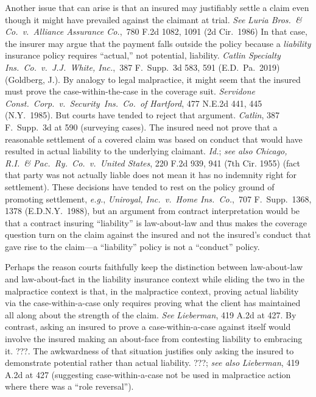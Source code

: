 \documentclass[
  12pt,
  letterpaper,
]{scrartcl}
\begin{document}
Another issue that can arise is that an insured may justifiably settle a claim
even though it might have prevailed against the claimant at trial. \textit{See}
\textit{Luria Bros.~\& Co.~v.~Alliance Assurance Co.},~780 F.2d 1082, 1091 (2d
Cir.~1986) In that case, the insurer may argue that the payment falls outside
the policy because a \emph{liability} insurance policy requires ``actual,'' not
potential, liability. \textit{Catlin Specialty Ins.~Co.~v.~J.J.~White,
Inc.},~387 F.~Supp.~3d 583, 591 (E.D.~Pa.~2019) (Goldberg, J.). By analogy to
legal malpractice, it might seem that the insured must prove the
case-within-the-case in the coverage suit. \textit{Servidone
Const.~Corp.~v.~Security~Ins.~Co.~of Hartford}, 477 N.E.2d 441, 445
(N.Y.~1985). But courts have tended to reject that argument. \textit{Catlin},
387 F.~Supp.~3d at 590 (surveying cases). The insured need not prove that a
reasonable settlement of a covered claim was based on conduct that would have
resulted in actual liability to the underlying claimant. \textit{Id.};
\textit{see also} \textit{Chicago, R.I.~\& Pac.~Ry.~Co.~v.~United States}, 220
F.2d 939, 941 (7th Cir. 1955) (fact that party was not actually liable does not
mean it has no indemnity right for settlement). These decisions have tended to
rest on the policy ground of promoting settlement, \textit{e.g.},
\textit{Uniroyal, Inc.~v.~Home Ins.~Co.},~707 F.~Supp.~1368, 1378
(E.D.N.Y.~1988), but an argument from contract interpretation would be that a
contract insuring ``liability'' is law-about-law and thus makes the coverage
question turn on the claim against the insured and not the insured's conduct
that gave rise to the claim---a ``liability'' policy is not a ``conduct''
policy.

Perhaps the reason courts faithfully keep the distinction between
law-about-law and law-about-fact in the liability insurance context while
eliding the two in the malpractice context is that, in the malpractice context,
proving actual liability via the case-within-a-case only requires proving what the client has
maintained all along about the strength of the claim. \textit{See}
\textit{Lieberman}, 419 A.2d at 427. By contrast, asking an insured to prove
a case-within-a-case against itself would involve the insured making an about-face from
contesting liability to embracing it. ???. The awkwardness of that situation
justifies only asking the insured to demonstrate potential rather than actual
liability. ???; \textit{see also} \textit{Lieberman}, 419 A.2d at 427
(suggesting case-within-a-case not be used in malpractice action where there
was a ``role reversal'').
\end{document}
